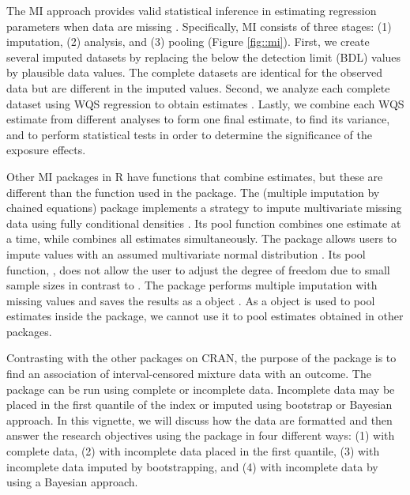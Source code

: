The MI approach provides valid statistical inference in estimating
regression parameters when data are missing
\citep{dongPrincipledMissingData2013, rubinMultipleImputationNonresponse1987, whiteMultipleImputationUsing2011}.
Specifically, MI consists of three stages: (1) imputation, (2) analysis,
and (3) pooling (Figure \ref{fig::mi}). First, we create several imputed
datasets by replacing the below the detection limit (BDL) values by
plausible data values. The complete datasets are identical for the
observed data but are different in the imputed values. Second, we
analyze each complete dataset using WQS regression to obtain estimates
\citep{carricoCharacterizationWeightedQuantile2014, czarnotaAssessmentWeightedQuantile2015, genningsCohortStudyEvaluation2013, hargartenAccountingUncertaintyDue2020}.
Lastly, we combine each WQS estimate from different analyses to form one
final estimate, to find its variance, and to perform statistical tests
in order to determine the significance of the exposure effects.

Other MI packages in R have functions that combine estimates, but these
are different than the  function used in the 
package. The  (multiple imputation by chained equations)
package implements a strategy to impute multivariate missing data using
fully conditional densities
\citep{vanbuurenMiceMultivariateImputation2011}. Its pool function
combines one estimate at a time, while  combines all
estimates simultaneously. The  package allows users to
impute values with an assumed multivariate normal distribution
\citep{novoNormAnalysisMultivariate2013}. Its pool function,
, does not allow the user to adjust the degree of
freedom due to small sample sizes in contrast to . The
 package performs multiple imputation with missing values
and saves the results as a  object \citep{JSSv045i02}. As
a  object is used to pool estimates inside the 
package, we cannot use it to pool estimates obtained in other packages.

Contrasting with the other packages on CRAN, the purpose of the
 package is to find an association of interval-censored
mixture data with an outcome. The  package can be run using
complete or incomplete data. Incomplete data may be placed in the first
quantile of the index or imputed using bootstrap or Bayesian approach.
In this vignette, we will discuss how the data are formatted and then
answer the research objectives using the  package in four
different ways: (1) with complete data, (2) with incomplete data placed
in the first quantile, (3) with incomplete data imputed by
bootstrapping, and (4) with incomplete data by using a Bayesian
approach.

